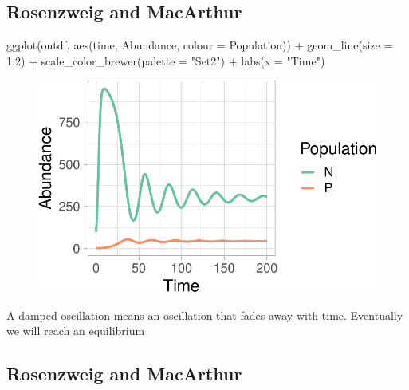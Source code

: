 \documentclass[
  letterpaper,
  DIV=11,
  numbers=noendperiod]{scrartcl}
\newenvironment{Shaded}{\begin{snugshade}}{\end{snugshade}}
\newcommand{\AttributeTok}[1]{\textcolor[rgb]{0.40,0.45,0.13}{#1}}
\newcommand{\FloatTok}[1]{\textcolor[rgb]{0.68,0.00,0.00}{#1}}
\newcommand{\FunctionTok}[1]{\textcolor[rgb]{0.28,0.35,0.67}{#1}}
\newcommand{\NormalTok}[1]{\textcolor[rgb]{0.00,0.23,0.31}{#1}}
\newcommand{\SpecialCharTok}[1]{\textcolor[rgb]{0.37,0.37,0.37}{#1}}
\newcommand{\StringTok}[1]{\textcolor[rgb]{0.13,0.47,0.30}{#1}}
\begin{document}
\hypertarget{rosenzweig-and-macarthur-2}{%
\subsection{Rosenzweig and MacArthur}\label{rosenzweig-and-macarthur-2}}

\begin{Shaded}
\begin{Highlighting}[]
\FunctionTok{ggplot}\NormalTok{(outdf, }\FunctionTok{aes}\NormalTok{(time, Abundance, }\AttributeTok{colour =}\NormalTok{ Population)) }\SpecialCharTok{+}
  \FunctionTok{geom\_line}\NormalTok{(}\AttributeTok{size =} \FloatTok{1.2}\NormalTok{) }\SpecialCharTok{+} 
  \FunctionTok{scale\_color\_brewer}\NormalTok{(}\AttributeTok{palette =} \StringTok{"Set2"}\NormalTok{) }\SpecialCharTok{+}
  \FunctionTok{labs}\NormalTok{(}\AttributeTok{x =} \StringTok{"Time"}\NormalTok{)}
\end{Highlighting}
\end{Shaded}

\begin{figure}[H]

{\centering \includegraphics{ecological_interactions_files/figure-pdf/unnamed-chunk-18-1.pdf}

}

\end{figure}

A damped oscillation means an oscillation that fades away with time.
Eventually we will reach an equilibrium

\hypertarget{rosenzweig-and-macarthur-3}{%
\subsection{Rosenzweig and MacArthur}\label{rosenzweig-and-macarthur-3}}
\end{document}

